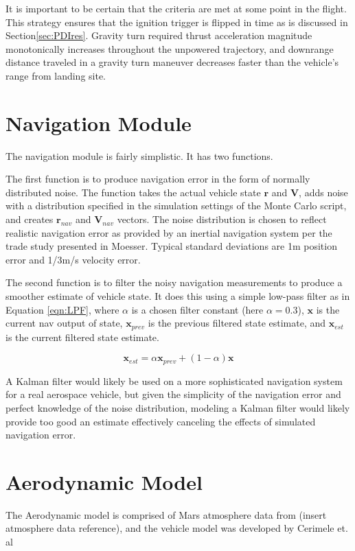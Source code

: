 It is important to be certain that the criteria are met at some point in the flight. This strategy ensures that the ignition trigger is flipped in time as is discussed in Section\:\ref{sec:PDIres}. Gravity turn required thrust acceleration magnitude monotonically increases throughout the unpowered trajectory, and downrange distance traveled in a gravity turn maneuver decreases faster than the vehicle's range from landing site.

\section{Navigation Module} \label{sec:navmod}
The navigation module is fairly simplistic. It has two functions. 

The first function is to produce navigation error in the form of normally distributed noise. The function takes the actual vehicle state $\bm{r}$ and $\bm{V}$, adds noise with a distribution specified in the simulation settings of the Monte Carlo script, and creates $\bm{r}_{nav}$ and $\bm{V}_{nav}$ vectors. The noise distribution is chosen to reflect realistic navigation error as provided by an inertial navigation system per the trade study presented in Moesser\:\cite{MOESSER}. Typical standard deviations are 1\:m position error and 1/3\:m/s velocity error.

The second function is to filter the noisy navigation measurements to produce a smoother estimate of vehicle state. It does this using a simple low-pass filter as in Equation \ref{eqn:LPF}, where $\alpha$ is a chosen filter constant (here $\alpha = 0.3$), $\bm{x}$ is the current nav output of state, $\bm{x}_{prev}$ is the previous filtered state estimate, and $\bm{x}_{est}$ is the current filtered state estimate. 

\begin{equation}
\label{eqn:LPF}
\bm{x}_{est} = \alpha \bm{x}_{prev} + (1-\alpha) \bm{x}
\end{equation}

A Kalman filter would likely be used on a more sophisticated navigation system for a real aerospace vehicle, but given the simplicity of the navigation error and perfect knowledge of the noise distribution, modeling a Kalman filter would likely provide too good an estimate effectively canceling the effects of simulated navigation error.

\section{Aerodynamic Model}
The Aerodynamic model is comprised of Mars atmosphere data from (insert atmosphere data reference), and the vehicle model was developed by Cerimele et. al\:\cite{CERIMELE}

